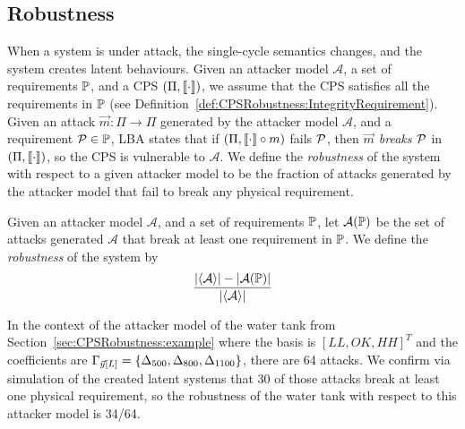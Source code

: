 {\subsection{Robustness}
When a system is under attack, the single-cycle semantics changes, and the system creates {latent behaviours}. Given an attacker model $\mathcal{A}$, a set of requirements $\mathbb{P}$, and a CPS $(\Pi,{{{\llbracket\cdot\rrbracket}}})$, we assume that the CPS satisfies all the requirements in $\mathbb{P}$ (see Definition~\ref{def:CPSRobustness:IntegrityRequirement}). Given an attack $\vec{m}\colon \Pi\rightarrow \Pi$ generated by the attacker model $\mathcal{A}$, and a requirement $\mathcal{P}\in\mathbb{P}$, LBA states that if $(\Pi,{{{\llbracket\cdot\rrbracket}}}\circ m)$ fails $\mathcal{P}$, then \emph{$\vec{m}$ breaks $\mathcal{P}$} in $(\Pi,{{{\llbracket\cdot\rrbracket}}})$, so the CPS is vulnerable to $\mathcal{A}$. %
We define the \emph{robustness} of the system with respect to a given attacker model to be the fraction of attacks generated by the attacker model that fail to break any physical requirement. 

\begin{definition}[Robustness]
  \label{def:CPSRobustness:Robustness}
  Given an attacker model $\mathcal{A}$, and a set of requirements $\mathbb{P}$, let $\mathcal{A}(\mathbb{P})$ be the set of attacks generated $\mathcal{A}$ that break at least one requirement in $\mathbb{P}$. We define 
  the \emph{robustness} of the system by 
  \begin{align*}
    \frac{|{{\left<\mathcal{A}\right>}}|-|\mathcal{A}(\mathbb{P})|}{|{{\left<\mathcal{A}\right>}}|}
  \end{align*}
\end{definition}

\begin{example}
  In the context of the attacker model of the water tank from Section~\ref{sec:CPSRobustness:example} where the basis is $[LL, OK, HH]^T$ and the coefficients are $\Gamma_{\vec{y}[L]}=\left\{{\Delta}_{500}, {\Delta}_{800},  {\Delta}_{1100}\right\}$, there are 64 attacks. We confirm via simulation of the created latent systems that 30 of those attacks break at least one physical requirement, so the robustness of the water tank with respect to this attacker model is 34/64.
\end{example}
}

